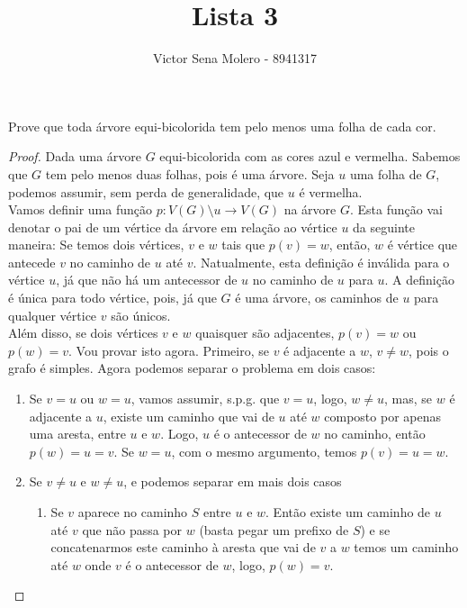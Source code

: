 \documentclass[12pt]{article}
\newenvironment{problem}[2][Ex]{\begin{trivlist}
\item[\hskip \labelsep {\bfseries #1}\hskip \labelsep {\bfseries #2.}]}{\end{trivlist}}
\begin{document}
 
 
\title{Lista 3}
\author{Victor Sena Molero - 8941317}
\maketitle

\begin{problem}{Bônus-1}
Prove que toda árvore equi-bicolorida tem pelo menos uma folha de cada cor.
\end{problem}

\begin{proof}
Dada uma árvore $G$ equi-bicolorida com as cores azul e vermelha. Sabemos que $G$ tem pelo menos duas folhas, pois é uma árvore. Seja $u$ uma folha de $G$, podemos assumir, sem perda de generalidade, que $u$ é vermelha. \\
Vamos definir uma função $p : V(G) \setminus u \to V(G)$ na árvore $G$. Esta função vai denotar o pai de um vértice da árvore em relação ao vértice $u$ da seguinte maneira: Se temos dois vértices, $v$ e $w$ tais que $p(v) = w$, então, $w$ é vértice que antecede $v$ no caminho de $u$ até $v$. Natualmente, esta definição é inválida para o vértice $u$, já que não há um antecessor de $u$ no caminho de $u$ para $u$. A definição é única para todo vértice, pois, já que $G$ é uma árvore, os caminhos de $u$ para qualquer vértice $v$ são únicos. \\
Além disso, se dois vértices $v$ e $w$ quaisquer são adjacentes, $p(v) = w$ ou $p(w) = v$. Vou provar isto agora. Primeiro, se $v$ é adjacente a $w$, $v \neq w$, pois o grafo é simples. Agora podemos separar o problema em dois casos: \\
\begin{enumerate}
\item Se $v = u$ ou $w = u$, vamos assumir, s.p.g. que $v = u$, logo, $w \neq u$, mas, se $w$ é adjacente a $u$, existe um caminho que vai de $u$ até $w$ composto por apenas uma aresta, entre $u$ e $w$. Logo, $u$ é o antecessor de $w$ no caminho, então $p(w) = u = v$. Se $w = u$, com o mesmo argumento, temos $p(v) = u = w$. \\
\item Se $v \neq u$ e $w \neq u$, e podemos separar em mais dois casos
\begin{enumerate}
\item Se $v$ aparece no caminho $S$ entre $u$ e $w$. Então existe um caminho de $u$ até $v$ que não passa por $w$ (basta pegar um prefixo de $S$) e se concatenarmos este caminho à aresta que vai de $v$ a $w$ temos um caminho até $w$ onde $v$ é o antecessor de $w$, logo, $p(w) = v$.

\end{enumerate}
\end{enumerate}
\end{proof}
\end{document}
